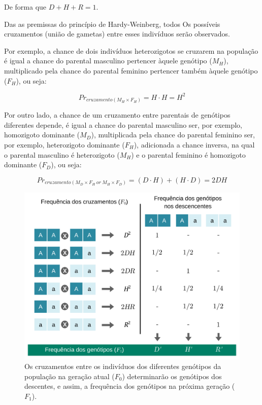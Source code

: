 \documentclass[
]{book}
\begin{document}
De forma que \(D+H+R=1\).

Das as premissas do princípio de Hardy-Weinberg, todos Os possíveis cruzamentos (união de gametas) entre esses indivíduos serão observados.

Por exemplo, a chance de dois indivíduos heterozigotos se cruzarem na população é igual a chance do parental masculino pertencer àquele genótipo (\(M_H\)), multiplicado pela chance do parental feminino pertencer também àquele genótipo (\(F_H\)), ou seja:

\[Pr_{cruzamento(M_H \times F_H)} = H \cdot H = H^2\]

Por outro lado, a chance de um cruzamento entre parentais de genótipos diferentes depende, é igual a chance do parental masculino ser, por exemplo, homozigoto dominante (\(M_D\)), multiplicada pela chance do parental feminino ser, por exemplo, heterozigoto dominante (\(F_H\)), adicionada a chance inversa, na qual o parental masculino é heterozigoto (\(M_H\)) e o parental feminino é homozigoto dominante (\(F_D\)), ou seja:

\[Pr_{cruzamento(M_D \times F_H \ or \ M_H \times F_D)} = \left( D \cdot H \right) + \left( H \cdot D \right) = 2DH\]

\begin{figure}

{\centering \includegraphics[width=600px]{figs/freq_cruzamentos_HW} 

}

\caption{Os cruzamentos entre os indivíduos dos diferentes genótipos da população na geração atual ($F_0$) determinarão os genótipos dos descentes, e assim, a frequência dos genótipos na próxima geração ($F_1$).}\label{fig:cruzapop}
\end{figure}
\end{document}
